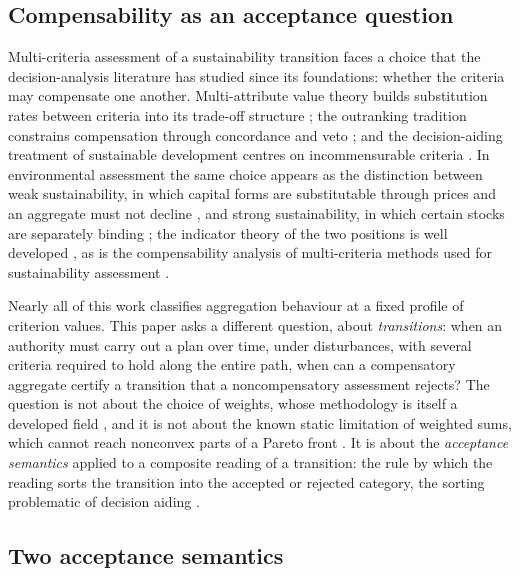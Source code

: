 \documentclass[preprint,11pt,authoryear]{elsarticle}
\theoremstyle{definition}
\theoremstyle{remark}
\begin{document}
\subsection{Compensability as an acceptance question}

Multi-criteria assessment of a sustainability transition faces a choice that the decision-analysis literature has studied since its foundations: whether the criteria may compensate one another. Multi-attribute value theory builds substitution rates between criteria into its trade-off structure \citep{KeeneyRaiffa1976}; the outranking tradition constrains compensation through concordance and veto \citep{Roy1996,Vincke1992}; and the decision-aiding treatment of sustainable development centres on incommensurable criteria \citep{Munda2005,MartinezAlier1998}. In environmental assessment the same choice appears as the distinction between weak sustainability, in which capital forms are substitutable through prices and an aggregate must not decline \citep{WorldBank2011,Neumayer2013,Boos2015}, and strong sustainability, in which certain stocks are separately binding \citep{Daly1990,Ekins2003}; the indicator theory of the two positions is well developed \citep{Hanley1999,Martinet2011,CairnsMartinet2014,DoyenGajardo2020,Usubiaga2025}, as is the compensability analysis of multi-criteria methods used for sustainability assessment \citep{Cinelli2014,Schar2025}.

Nearly all of this work classifies aggregation behaviour at a fixed profile of criterion values. This paper asks a different question, about \emph{transitions}: when an authority must carry out a plan over time, under disturbances, with several criteria required to hold along the entire path, when can a compensatory aggregate certify a transition that a noncompensatory assessment rejects? The question is not about the choice of weights, whose methodology is itself a developed field \citep{Nardo2008,Becker2017}, and it is not about the known static limitation of weighted sums, which cannot reach nonconvex parts of a Pareto front \citep{DasDennis1997}. It is about the \emph{acceptance semantics} applied to a composite reading of a transition: the rule by which the reading sorts the transition into the accepted or rejected category, the sorting problematic of decision aiding \citep{Roy1996}.

\subsection{Two acceptance semantics}
\end{document}
